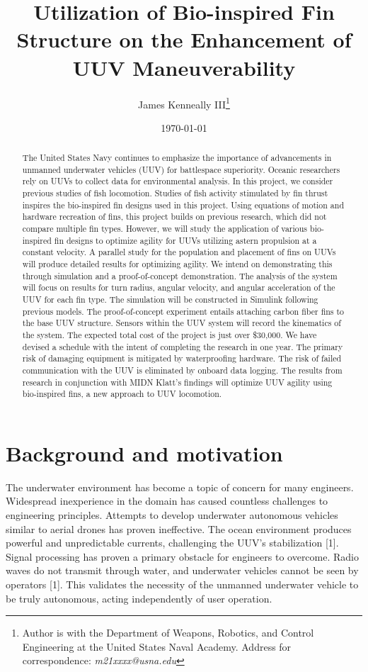 \documentclass{IEEEtran}
\title{Utilization of Bio-inspired Fin Structure on the Enhancement of UUV Maneuverability}
\author{James Kenneally III\thanks{Author is with the Department of Weapons, Robotics, and Control Engineering at the United States Naval Academy. Address for correspondence: \emph{m21xxxx@usna.edu}}}
\date{\today}
\begin{document}
\maketitle
\begin{abstract}
The United States Navy continues to emphasize the importance of advancements in unmanned underwater vehicles (UUV) for battlespace superiority.  Oceanic researchers rely on UUVs to collect data for environmental analysis.  In this project, we consider previous studies of fish locomotion.  Studies of fish activity stimulated by fin thrust inspires the bio-inspired fin designs used in this project.  Using equations of motion and hardware recreation of fins, this project builds on previous research, which did not compare multiple fin types.  However, we will study the application of various bio-inspired fin designs to optimize agility for UUVs utilizing astern propulsion at a constant velocity.  A parallel study for the population and placement of fins on UUVs will produce detailed results for optimizing agility.  We intend on demonstrating this through simulation and a proof-of-concept demonstration.  The analysis of the system will focus on results for turn radius, angular velocity, and angular acceleration of the UUV for each fin type.  The simulation will be constructed in Simulink following previous models.  The proof-of-concept experiment entails attaching carbon fiber fins to the base UUV structure.  Sensors within the UUV system will record the kinematics of the system.  The expected total cost of the project is just over \$30,000.  We have devised a schedule with the intent of completing the research in one year.  The primary risk of damaging equipment is mitigated by waterproofing hardware.  The risk of failed communication with the UUV is eliminated by onboard data logging.  The results from research in conjunction with MIDN Klatt’s findings will optimize UUV agility using bio-inspired fins, a new approach to UUV locomotion.  
\end{abstract}

\section{Background and motivation}
The underwater environment has become a topic of concern for many engineers.  Widespread inexperience in the domain has caused countless challenges to engineering principles.  Attempts to develop underwater autonomous vehicles similar to aerial drones has proven ineffective.  The ocean environment produces powerful and unpredictable currents, challenging the UUV’s stabilization [1].  Signal processing has proven a primary obstacle for engineers to overcome.  Radio waves do not transmit through water, and underwater vehicles cannot be seen by operators [1].  This validates the necessity of the unmanned underwater vehicle to be truly autonomous, acting independently of user operation.  
\end{document}

